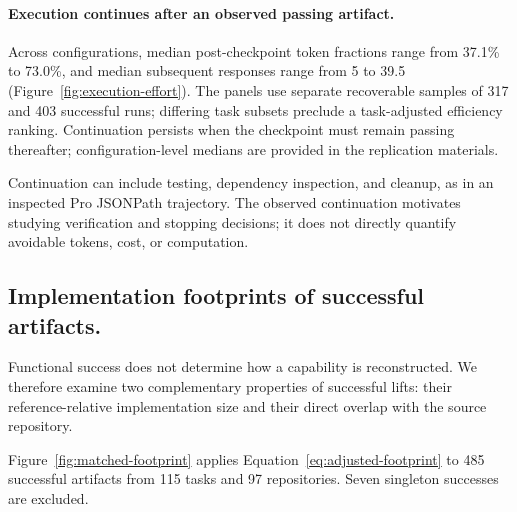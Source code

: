 \documentclass[acmsmall,screen,review,anonymous]{acmart}
\begin{document}
\paragraph{Execution continues after an observed passing artifact.}
Across configurations, median post-checkpoint token fractions range from
37.1\% to 73.0\%, and median subsequent responses range from 5 to 39.5
(Figure~\ref{fig:execution-effort}). The panels use separate recoverable samples
of 317 and 403 successful runs; differing task subsets preclude a task-adjusted
efficiency ranking. Continuation persists when the checkpoint must remain passing
thereafter; configuration-level medians are provided in the replication materials.

Continuation can include testing, dependency inspection, and cleanup, as in an
inspected Pro JSONPath trajectory. The observed continuation
motivates studying verification and stopping decisions; it does not directly
quantify avoidable tokens, cost, or computation.

\subsection{Implementation footprints of successful artifacts.}
\label{sec:footprint-results}

Functional success does not determine how a capability is reconstructed.
We therefore examine two complementary properties of successful lifts:
their reference-relative implementation size and their direct overlap with
the source repository.

Figure~\ref{fig:matched-footprint} applies
Equation~\ref{eq:adjusted-footprint}
to 485 successful artifacts from 115 tasks and 97 repositories.
Seven singleton successes are excluded.
\end{document}
